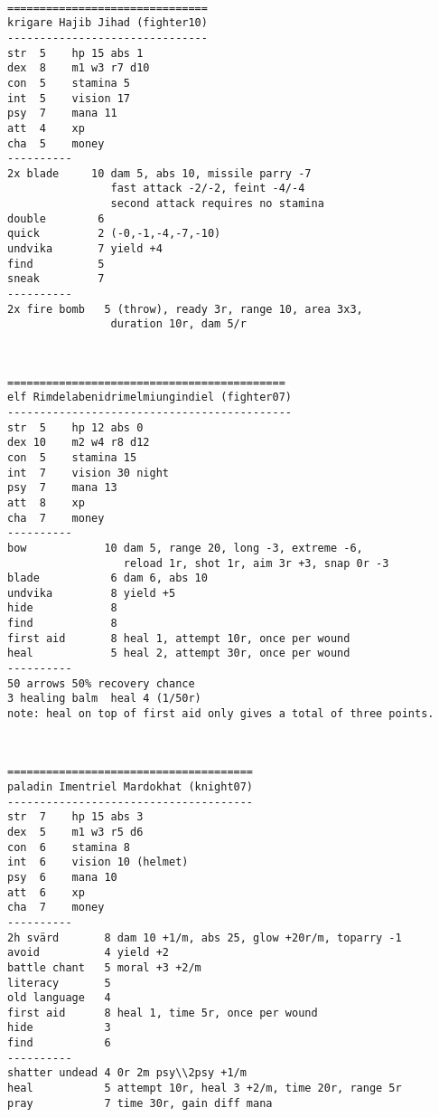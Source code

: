 \

\pagebreak[1]
\tiny \begin{samepage} \begin{verbatim}
===============================
krigare Hajib Jihad (fighter10)
-------------------------------
str  5    hp 15 abs 1
dex  8    m1 w3 r7 d10
con  5    stamina 5
int  5    vision 17
psy  7    mana 11
att  4    xp
cha  5    money
----------
2x blade     10 dam 5, abs 10, missile parry -7
                fast attack -2/-2, feint -4/-4
                second attack requires no stamina
double        6
quick         2 (-0,-1,-4,-7,-10)
undvika       7 yield +4
find          5
sneak         7
----------
2x fire bomb   5 (throw), ready 3r, range 10, area 3x3,
                duration 10r, dam 5/r
\end{verbatim} \end{samepage} \normalsize


\

\pagebreak[1]
\tiny \begin{samepage} \begin{verbatim}
===========================================
elf Rimdelabenidrimelmiungindiel (fighter07)
--------------------------------------------
str  5    hp 12 abs 0
dex 10    m2 w4 r8 d12
con  5    stamina 15
int  7    vision 30 night
psy  7    mana 13
att  8    xp
cha  7    money
----------
bow            10 dam 5, range 20, long -3, extreme -6,
                  reload 1r, shot 1r, aim 3r +3, snap 0r -3
blade           6 dam 6, abs 10
undvika         8 yield +5
hide            8
find            8
first aid       8 heal 1, attempt 10r, once per wound
heal            5 heal 2, attempt 30r, once per wound
----------
50 arrows 50% recovery chance
3 healing balm  heal 4 (1/50r)
note: heal on top of first aid only gives a total of three points.
\end{verbatim} \end{samepage} \normalsize


\

\pagebreak[1]
\tiny \begin{samepage} \begin{verbatim}
======================================
paladin Imentriel Mardokhat (knight07)
--------------------------------------
str  7    hp 15 abs 3
dex  5    m1 w3 r5 d6
con  6    stamina 8
int  6    vision 10 (helmet)
psy  6    mana 10
att  6    xp
cha  7    money
----------
2h svärd       8 dam 10 +1/m, abs 25, glow +20r/m, toparry -1
avoid          4 yield +2
battle chant   5 moral +3 +2/m
literacy       5
old language   4
first aid      8 heal 1, time 5r, once per wound
hide           3
find           6
----------
shatter undead 4 0r 2m psy\\2psy +1/m
heal           5 attempt 10r, heal 3 +2/m, time 20r, range 5r
pray           7 time 30r, gain diff mana
\end{verbatim} \end{samepage} \normalsize


